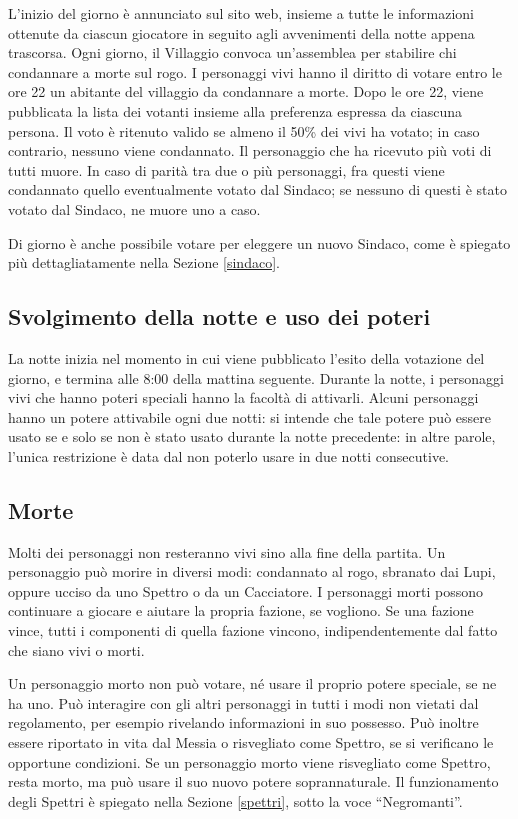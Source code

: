 \documentclass[a4paper,10pt]{article}
\begin{document}
L'inizio del giorno è annunciato sul sito web, insieme a tutte le informazioni ottenute da ciascun giocatore in seguito agli avvenimenti della notte appena trascorsa.
Ogni giorno, il Villaggio convoca un'assemblea per stabilire chi condannare a morte sul rogo.
I personaggi vivi hanno il diritto di votare entro le ore 22 un abitante del villaggio da condannare a morte. Dopo le ore 22, viene pubblicata la lista dei votanti insieme alla preferenza espressa da ciascuna persona.
Il voto è ritenuto valido se almeno il 50\% dei vivi ha votato; in caso contrario, nessuno viene condannato. Il personaggio che ha ricevuto più voti di tutti muore.
In caso di parità tra due o più personaggi, fra questi viene condannato quello eventualmente votato dal Sindaco; se nessuno di questi è stato votato dal Sindaco, ne muore uno a caso.

Di giorno è anche possibile votare per eleggere un nuovo Sindaco, come è spiegato più dettagliatamente nella Sezione \ref{sindaco}.


\subsection{Svolgimento della notte e uso dei poteri}

La notte inizia nel momento in cui viene pubblicato l'esito della votazione del giorno, e termina alle 8:00 della mattina seguente.
Durante la notte, i personaggi vivi che hanno poteri speciali hanno la facoltà di attivarli.
Alcuni personaggi hanno un potere attivabile ogni due notti: si intende che tale potere può essere usato se e solo se non è stato usato durante la notte precedente: in altre parole, l'unica restrizione è data dal non poterlo usare in due notti consecutive.

\subsection{Morte}

Molti dei personaggi non resteranno vivi sino alla fine della partita. Un personaggio può morire in diversi modi: condannato al rogo, sbranato dai Lupi, oppure ucciso da uno Spettro o da un Cacciatore.
I personaggi morti possono continuare a giocare e aiutare la propria fazione, se vogliono. Se una fazione vince, tutti i componenti di quella fazione vincono, indipendentemente dal fatto che siano vivi o morti.

Un personaggio morto non può votare, né usare il proprio potere speciale, se ne ha uno. Può interagire con gli altri personaggi in tutti i modi non vietati dal regolamento, per esempio rivelando informazioni in suo possesso. Può inoltre essere riportato in vita dal Messia o risvegliato come Spettro, se si verificano le opportune condizioni.
Se un personaggio morto viene risvegliato come Spettro, resta morto, ma può usare il suo nuovo potere soprannaturale. Il funzionamento degli Spettri è spiegato nella Sezione \ref{spettri}, sotto la voce ``Negromanti''.
\end{document}
